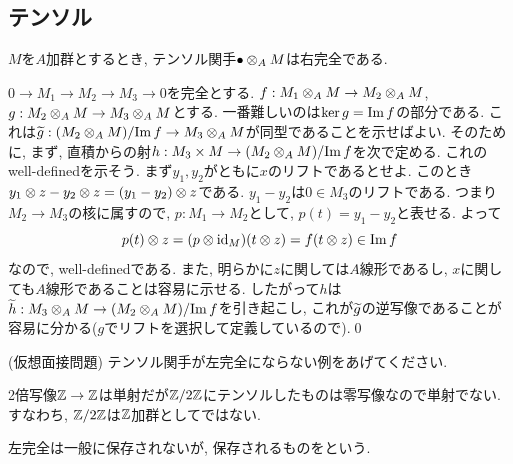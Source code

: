 \newpage
\subsection{テンソル}

\begin{prop} $M$を$A$加群とするとき,
テンソル関手$\bullet \mathbin{\otimes}_{A} M$は右完全である.
\end{prop}
\prf
$0\to M_1\to M_2\to M_3 \to 0$を完全とする. $f:M_1\mathbin{\otimes}_{A} M \to M_2\mathbin{\otimes}_{A} M$, $g:M_2\mathbin{\otimes}_{A} M \to M_{3}\mathbin{\otimes}_{A} M$とする. 一番難しいのは$\ker{g} = \mathrm{Im}\,f$の部分である. これは$\widetilde{g}: (M_2\mathbin{\otimes}_{A} M)/\mathrm{Im}\,f \to M_3\mathbin{\otimes}_{A} M$が同型であることを示せばよい. そのために,  まず, 直積からの射$h:M_3\times M \to (M_2\mathbin{\otimes}_{A} M)/\mathrm{Im}\,f$を次で定める.
これのwell-definedを示そう. まず$y_1,y_2$がともに$x$のリフトであるとせよ. このとき$y_1\mathbin{\otimes} z - y_2\mathbin{\otimes} z = (y_1-y_2)\mathbin{\otimes} z$である. $y_1-y_2$は$0\in M_3$のリフトである. つまり$M_2\to M_3$の核に属すので, $p:M_1\to M_2$として, $p(t) = y_1-y_2$と表せる. よって
\[p(t)\mathbin{\otimes} z = (p\mathbin{\otimes} \mathrm{id}_{M})(t\mathbin{\otimes} z) = f(t\mathbin{\otimes} z)\in \mathrm{Im}\,f\]
なので, well-definedである. また, 明らかに$z$に関しては$A$線形であるし, $x$に関しても$A$線形であることは容易に示せる. したがって$h$は$\widetilde{h}:M_3\mathbin{\otimes}_{A} M \to (M_2\mathbin{\otimes}_{A} M)/\mathrm{Im}\,f$を引き起こし, これが$\widetilde{g}$の逆写像であることが容易に分かる($g$でリフトを選択して定義しているので).\qed

\begin{egprob}(仮想面接問題)
テンソル関手が左完全にならない例をあげてください.
\end{egprob}
\begin{egans}
2倍写像$\mathbb{Z}\to \mathbb{Z}$は単射だが$\mathbb{Z}/2\mathbb{Z}$にテンソルしたものは零写像なので単射でない. すなわち, $\mathbb{Z}/2\mathbb{Z}$は$\mathbb{Z}$加群としてではない.
\end{egans}
左完全は一般に保存されないが, 保存されるものをという.


